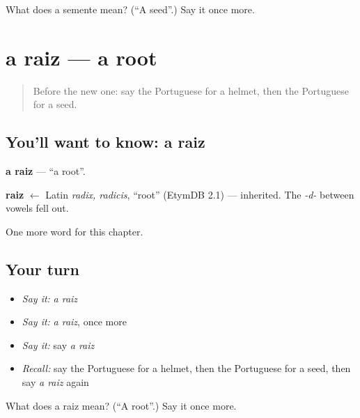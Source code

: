 \begin{tcolorbox}[breakable,colback=teal!4,colframe=teal!35!black,title={Before you move on}]
What does a semente mean? (\textquotedblleft{}A seed\textquotedblright{}.) Say it once more.
\end{tcolorbox}
\section[a raiz]{a raiz — a root}

\label{lesson:PT-C250-raiz}



\begin{quote}
Before the new one: say the Portuguese for a helmet, then the Portuguese for a seed.
\end{quote}

\subsection*{You'll want to know: a raiz}
\textbf{a raiz} — \textquotedblleft{}a root\textquotedblright{}.

\begin{cousinweb}
\textbf{raiz} $\leftarrow$ Latin \emph{radix, radicis}, \textquotedblleft{}root\textquotedblright{} (EtymDB 2.1) — inherited. The \emph{-d-} between vowels fell out.
\end{cousinweb}

\begin{grammarlens}[title={What you've built}]
One more word for this chapter.
\end{grammarlens}

\subsection*{Your turn}
\begin{itemize}
\raggedright
  \item \emph{Say it:} \emph{a raiz}
  \item \emph{Say it:} \emph{a raiz}, once more
  \item \emph{Say it:} say \emph{a raiz}
  \item \emph{Recall:} say the Portuguese for a helmet, then the Portuguese for a seed, then say \emph{a raiz} again
\end{itemize}

\begin{tcolorbox}[breakable,colback=teal!4,colframe=teal!35!black,title={Before you move on}]
What does a raiz mean? (\textquotedblleft{}A root\textquotedblright{}.) Say it once more.
\end{tcolorbox}
